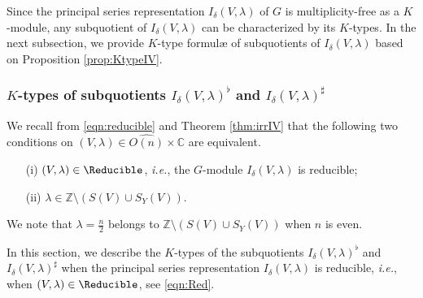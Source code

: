 Since the principal series representation $I_{\delta}(V,\lambda)$
 of $G$ is multiplicity-free as a $K$-module,
 any subquotient of $I_{\delta}(V,\lambda)$
 can be characterized 
 by its $K$-types.  
In the next subsection, 
 we provide $K$-type formul{\ae}
 of subquotients of $I_{\delta}(V,\lambda)$
 based on Proposition \ref{prop:KtypeIV}.  


\subsubsection{$K$-types of subquotients
 $I_{\delta}(V,\lambda)^{\flat}$ and $I_{\delta}(V,\lambda)^{\sharp}$}

We recall from \eqref{eqn:reducible}
 and Theorem \ref{thm:irrIV}
 that the following two conditions on $(V,\lambda) \in \widehat{O(n)} \times {\mathbb{C}}$ 
 are equivalent.  
\begin{enumerate}
\item[(i)]
$(V,\lambda) \in \Reducible$, 
 {\it{i.e.}}, the $G$-module $I_{\delta}(V,\lambda)$ is reducible; 
\item[(ii)]
$\lambda \in {\mathbb{Z}} \setminus (S(V) \cup S_Y(V))$.  
\end{enumerate}

We note that $\lambda = \frac n 2$ belongs
 to ${\mathbb{Z}} \setminus (S(V) \cup S_Y(V))$
 when $n$ is even.  



In this section, 
  we describe the $K$-types of the subquotients
 $I_{\delta}(V,\lambda)^{\flat}$ and $I_{\delta}(V,\lambda)^{\sharp}$
 when the principal series representation
 $I_{\delta}(V,\lambda)$ is reducible, 
 {\it{i.e.}}, 
 when $(V,\lambda) \in \Reducible$, 
 see \eqref{eqn:Red}.  



